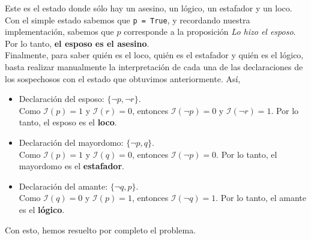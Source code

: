 \documentclass[letterpaper,12pt]{article}
\begin{document}
    \justify
    Este es el estado donde sólo hay un asesino, un lógico, un estafador 
    y un loco. Con el simple estado sabemos que \texttt{p = True}, y 
    recordando nuestra implementación, sabemos que $p$ corresponde a la 
    proposición \textit{Lo hizo el esposo}. Por lo tanto, 
    \textbf{el esposo es el asesino}. \\
    Finalmente, para saber quién es el loco, quién es el estafador y 
    quién es el lógico, basta realizar manualmente la interpretación de 
    cada una de las declaraciones de los sospechosos con el estado que 
    obtuvimos anteriormente. Así, 
    \begin{itemize}
        \item Declaración del esposo: $\{ \neg p, \neg r \}$. \\
        Como $\mathcal{I}(p) = 1$ y $\mathcal{I}(r) = 0$, entonces 
        $\mathcal{I}(\neg p) = 0$ y $\mathcal{I}(\neg r) = 1$. Por lo tanto,
        el esposo es el \textbf{loco}.
        \item Declaración del mayordomo: $\{\neg p, q \}$. \\
        Como $\mathcal{I}(p) = 1$ y $\mathcal{I}(q) = 0$, entonces 
        $\mathcal{I}(\neg p) = 0$. Por lo tanto, el mayordomo es el
        \textbf{estafador}.
        \item Declaración del amante: $\{\neg q, p \}$. \\
        Como $\mathcal{I}(q) = 0$ y $\mathcal{I}(p) = 1$, entonces 
        $\mathcal{I}(\neg q) = 1$. Por lo tanto, el amante es el 
        \textbf{lógico}. 
    \end{itemize}

    \justify
    Con esto, hemos resuelto por completo el problema.
    
\end{document}
